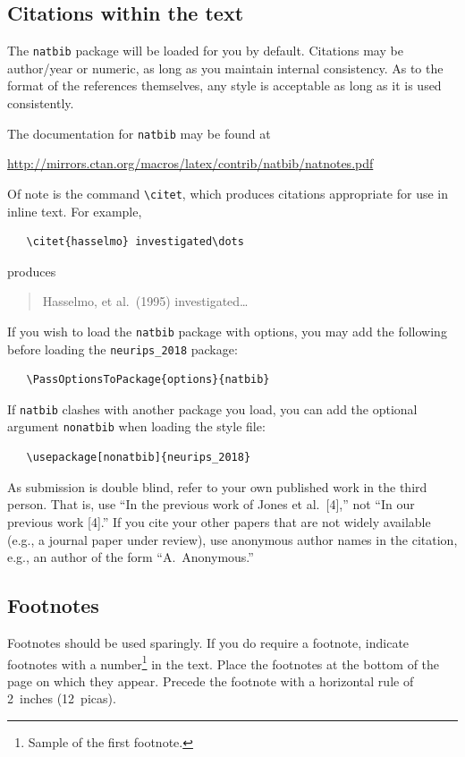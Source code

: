 \documentclass{article}
\begin{document}
\subsection{Citations within the text}

The \verb+natbib+ package will be loaded for you by default.  Citations may be
author/year or numeric, as long as you maintain internal consistency.  As to the
format of the references themselves, any style is acceptable as long as it is
used consistently.

The documentation for \verb+natbib+ may be found at
\begin{center}
  \url{http://mirrors.ctan.org/macros/latex/contrib/natbib/natnotes.pdf}
\end{center}
Of note is the command \verb+\citet+, which produces citations appropriate for
use in inline text.  For example,
\begin{verbatim}
   \citet{hasselmo} investigated\dots
\end{verbatim}
produces
\begin{quote}
  Hasselmo, et al.\ (1995) investigated\dots
\end{quote}

If you wish to load the \verb+natbib+ package with options, you may add the
following before loading the \verb+neurips_2018+ package:
\begin{verbatim}
   \PassOptionsToPackage{options}{natbib}
\end{verbatim}

If \verb+natbib+ clashes with another package you load, you can add the optional
argument \verb+nonatbib+ when loading the style file:
\begin{verbatim}
   \usepackage[nonatbib]{neurips_2018}
\end{verbatim}

As submission is double blind, refer to your own published work in the third
person. That is, use ``In the previous work of Jones et al.\ [4],'' not ``In our
previous work [4].'' If you cite your other papers that are not widely available
(e.g., a journal paper under review), use anonymous author names in the
citation, e.g., an author of the form ``A.\ Anonymous.''

\subsection{Footnotes}

Footnotes should be used sparingly.  If you do require a footnote, indicate
footnotes with a number\footnote{Sample of the first footnote.} in the
text. Place the footnotes at the bottom of the page on which they appear.
Precede the footnote with a horizontal rule of 2~inches (12~picas).
\end{document}
